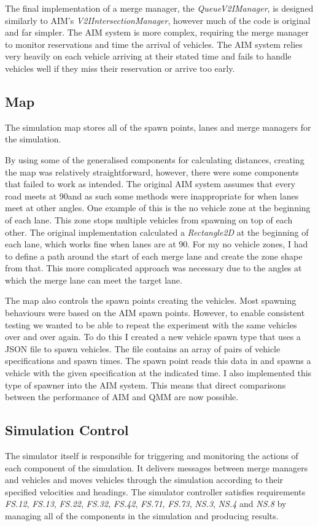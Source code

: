 The final implementation of a merge manager, the \emph{QueueV2IManager}, is designed similarly to AIM's \emph{V2IIntersectionManager}, however much of the code is original and far simpler. The AIM system is more complex, requiring the merge manager to monitor reservations and time the arrival of vehicles. The AIM system relies very heavily on each vehicle arriving at their stated time and fails to handle vehicles well if they miss their reservation or arrive too early.

\subsection{Map}
\label{subsec:Map}
The simulation map stores all of the spawn points, lanes and merge managers for the simulation.

By using some of the generalised components for calculating distances, creating the map was relatively straightforward, however, there were some components that failed to work as intended. The original AIM system assumes that every road meets at 90\degree and as such some methods were inappropriate for when lanes meet at other angles. One example of this is the no vehicle zone at the beginning of each lane. This zone stops multiple vehicles from spawning on top of each other. The original implementation calculated a \emph{Rectangle2D} at the beginning of each lane, which works fine when lanes are at 90\degree. For my no vehicle zones, I had to define a path around the start of each merge lane and create the zone shape from that. This more complicated approach was necessary due to the angles at which the merge lane can meet the target lane. 

The map also controls the spawn points creating the vehicles. Most spawning behaviours were based on the AIM spawn points. However, to enable consistent testing we wanted to be able to repeat the experiment with the same vehicles over and over again. To do this I created a new vehicle spawn type that uses a JSON file to spawn vehicles. The file contains an array of pairs of vehicle specifications and spawn times. The spawn point reads this data in and spawns a vehicle with the given specification at the indicated time. I also implemented this type of spawner into the AIM system. This means that direct comparisons between the performance of AIM and QMM are now possible.

\subsection{Simulation Control}
\label{subsec:Simulation Control}
The simulator itself is responsible for triggering and monitoring the actions of each component of the simulation. It delivers messages between merge managers and vehicles and moves vehicles through the simulation according to their specified velocities and headings. The simulator controller satisfies requirements \emph{FS.12}, \emph{FS.13}, \emph{FS.22}, \emph{FS.32}, \emph{FS.42}, \emph{FS.71}, \emph{FS.73}, \emph{NS.3}, \emph{NS.4} and \emph{NS.8} by managing all of the components in the simulation and producing results.

